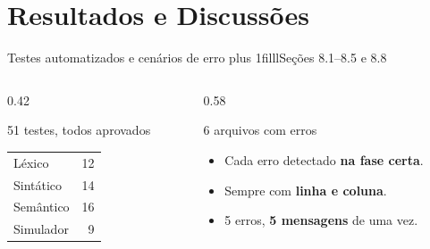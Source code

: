 \documentclass[aspectratio=169,12pt]{beamer}
\newcommand{\notexto}[1]{\hskip 0pt plus 1filll{\normalfont\small\color{white!85!acento}#1}}
\begin{document}
\section{Resultados e Discussões}

\begin{frame}{Testes automatizados e cenários de erro\notexto{Seções 8.1--8.5 e 8.8}}
  \begin{columns}[T]
    \begin{column}{0.42\textwidth}
      \begin{block}{51 testes, todos aprovados}
        \begin{tabular}{@{}lr@{}}
          Léxico     & 12 \\
          Sintático  & 14 \\
          Semântico  & 16 \\
          Simulador  & 9 \\
        \end{tabular}
      \end{block}
    \end{column}
    \begin{column}{0.58\textwidth}
      \begin{block}{6 arquivos com erros}
        \begin{itemize}
          \item Cada erro detectado \textbf{na fase certa}.
          \item Sempre com \textbf{linha e coluna}.
          \item 5 erros, \textbf{5 mensagens} de uma vez.
        \end{itemize}
      \end{block}
    \end{column}
  \end{columns}
\end{frame}
\end{document}
